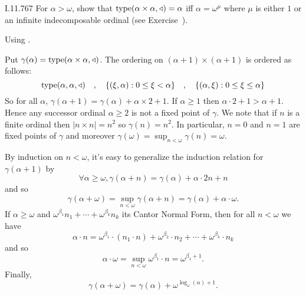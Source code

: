 \begin{lexcopy}{I.11.7}{67}
For \(\alpha > \omega\), show that
\(\mathop{\mathrm{type}}(\alpha \times \alpha, \triangleleft) = \alpha\) iff
\(\alpha = \omega^\mu\) where
\(\mu\) is either $1$ or an infinite indecomposable ordinal
(see Exercise~).
\end{lexcopy}

Using \cite{WangFrederic}.

Put \(\gamma(\alpha) = \mathop{\mathrm{type}}(\alpha \times \alpha, \triangleleft)\).
The ordering on \((\alpha+1)\times(\alpha+1)\) is ordered as follows:
\begin{equation*}
\mathop{\mathrm{type}}(\alpha, \alpha, \triangleleft)
\quad,\quad \{(\xi,\alpha): 0\leq\xi<\alpha\}
\quad,\quad \{(\alpha,\xi): 0\leq\xi\leq\alpha\}
\end{equation*}
So for all \(\alpha\),
\(\gamma(\alpha+1) = \gamma(\alpha) + \alpha\times 2 + 1\).
If \(\alpha \geq 1\) then \(\alpha\cdot 2+1 > \alpha+1\).
Hence any successor ordinal \(\alpha \geq 2\)
is not a fixed point of \(\gamma\).
We note that if $n$ is a finite ordinal then \(|n\times n| = n^2\)
so \(\gamma(n) = n^2\).
In particular, \(n=0\) and \(n=1\) are fixed points of \(\gamma\)
and moreover \(\gamma(\omega) = \sup_{n<\omega}\gamma(n) = \omega\).

By induction on \(n < \omega\), it’s easy to generalize the induction relation
for \(\gamma(\alpha+1)\) by
\begin{equation*}
\forall \alpha \geq \omega, \gamma(\alpha+n)=\gamma(\alpha)+\alpha\cdot 2n+n
\end{equation*}
and so
\begin{equation*}
\gamma(\alpha + \omega) = \sup_{n<\omega}\gamma(\alpha + n) =
\gamma(\alpha) + \alpha\cdot\omega.
\end{equation*}
If \(\alpha \geq \omega\) and
\(\omega^{\beta_1} n_1 + \cdots + \omega^{\beta_k} n_k\)
its Cantor
Normal Form, then for all \(n < \omega\)
we have
\begin{equation*}
\alpha \cdot n =
 \omega^{\beta_1}\cdot (n_1\cdot n) + \omega^{\beta_2}\cdot n_2 + \cdots +
   \omega^{\beta_k}\cdot n_k
\end{equation*}
and
so
\begin{equation*}
\alpha \cdot \omega = \sup_{n<\omega}\omega^{\beta_1} \cdot n = \omega^{\beta_1 + 1}.
\end{equation*}
Finally,
\begin{equation*}
\gamma(\alpha + \omega)=\gamma(\alpha) + \omega^{\log_\omega(\alpha) + 1}.
\end{equation*}

